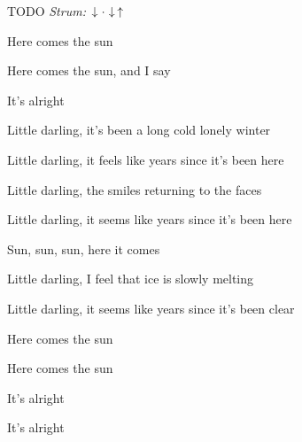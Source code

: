 \begin{song}


\begin{headerbox}
 \quad TODO
\textit{Strum:} $\Down\Miss\Down\Up$
\end{headerbox}

\begin{hchordbox}
\end{hchordbox}

\Large

\bigskip

\begin{chorusbox}{\Chorus}
 Here comes the sun  \par
{} Here comes the sun, and I say \par
{} It's alright   \par
\end{chorusbox}

\bigskip

 Little darling, it's been a long cold lonely winter \par
{} Little darling, it feels like years since it's been here \par

\bigskip

\Chorus

\bigskip

 

\bigskip

 Little darling, the smiles returning to the faces \par
{} Little darling, it seems like years since it's been here \par

\bigskip

\Chorus

\bigskip

 

\bigskip

 \par
{}Sun, sun, sun, here it comes  \par

\bigskip

 Little darling, I feel that ice is slowly melting \par
{} Little darling, it seems like years since it's been clear \par

\bigskip

\Chorus

\bigskip

 Here comes the sun  \par
{} Here comes the sun \par
{} It's alright   \par
{} It's alright   \par

   

\end{song}
